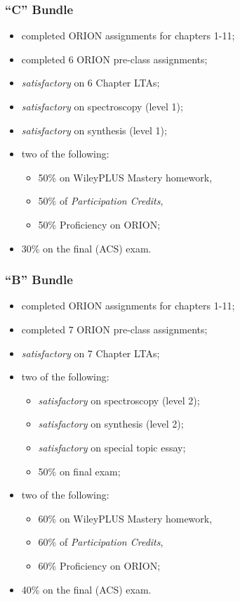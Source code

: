 \hypertarget{c-bundle}{%
\subsubsection{``C'' Bundle}\label{c-bundle}}

\begin{itemize}
\item
  completed ORION assignments for chapters 1-11;
\item
  completed 6 ORION pre-class assignments;
\item
  \emph{satisfactory} on 6 Chapter LTAs;
\item
  \emph{satisfactory} on spectroscopy (level 1);
\item
  \emph{satisfactory} on synthesis (level 1);
\item
  two of the following:

  \begin{itemize}
  \tightlist
  \item
    50\% on WileyPLUS Mastery homework,
  \item
    50\% of \emph{Participation Credits},
  \item
    50\% Proficiency on ORION;
  \end{itemize}
\item
  30\% on the final (ACS) exam.
\end{itemize}

\hypertarget{b-bundle}{%
\subsubsection{``B'' Bundle}\label{b-bundle}}

\begin{itemize}
\item
  completed ORION assignments for chapters 1-11;
\item
  completed 7 ORION pre-class assignments;
\item
  \emph{satisfactory} on 7 Chapter LTAs;
\item
  two of the following:

  \begin{itemize}
  \tightlist
  \item
    \emph{satisfactory} on spectroscopy (level 2);
  \item
    \emph{satisfactory} on synthesis (level 2);
  \item
    \emph{satisfactory} on special topic essay;
  \item
    50\% on final exam;
  \end{itemize}
\item
  two of the following:

  \begin{itemize}
  \tightlist
  \item
    60\% on WileyPLUS Mastery homework,
  \item
    60\% of \emph{Participation Credits},
  \item
    60\% Proficiency on ORION;
  \end{itemize}
\item
  40\% on the final (ACS) exam.
\end{itemize}

